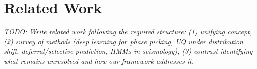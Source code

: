 \section{Related Work}
\label{sec:related_work}

\textit{TODO: Write related work following the required structure: (1) unifying concept, (2) survey of methods (deep learning for phase picking, UQ under distribution shift, deferral/selective prediction, HMMs in seismology), (3) contrast identifying what remains unresolved and how our framework addresses it.}
